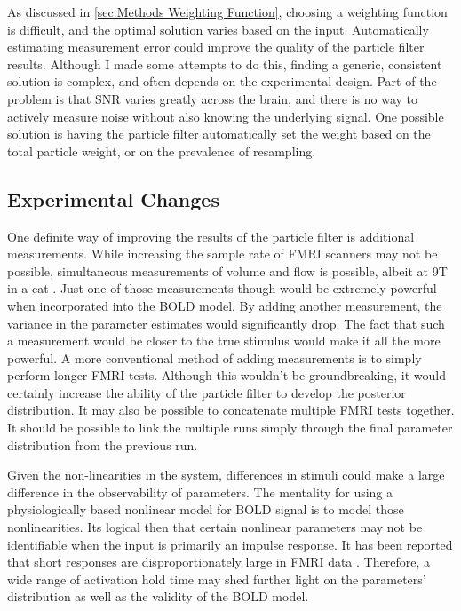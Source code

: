 As discussed in \autoref{sec:Methods Weighting Function}, choosing a weighting
function is difficult, and the optimal solution varies based on the input.
Automatically estimating measurement error could improve
the quality of the particle filter results. Although I made some attempts to do
this, finding a generic, consistent solution is complex, and often depends on the
experimental design. Part of the problem is that SNR varies greatly across
the brain, and there is no way to actively measure noise without also knowing
the underlying signal. One possible solution is having the particle filter automatically
set the weight based on the total particle weight, or on the prevalence of resampling.
 
\subsection{Experimental Changes}
\label{sec:Sideways Measurements}
One definite way of improving the results of the particle filter is additional
measurements. While increasing the sample rate of FMRI scanners may
not be possible, simultaneous measurements of volume and flow is
possible, albeit at 9T in a cat \cite{Hu2009}. Just one of those measurements
though would be extremely powerful when incorporated into the BOLD
model. By adding another measurement, the
variance in the parameter estimates would significantly drop. The fact
that such a measurement would be closer to the true stimulus would make it
all the more powerful. 
A more conventional method of adding measurements is to 
simply perform longer FMRI tests. Although this wouldn't be 
groundbreaking, it would certainly increase the ability of the 
particle filter to develop the posterior distribution. 
It may also be possible to concatenate multiple FMRI tests together.
It should be possible to link the multiple runs simply through
the final parameter distribution from the previous run. 

Given the non-linearities in the system, differences in stimuli
could make a large difference in the observability of parameters. The mentality 
for using a physiologically based nonlinear model for BOLD signal is to model 
those nonlinearities. Its logical then that certain nonlinear parameters may not
be identifiable when the input is primarily an impulse response. It 
has been reported that short responses are disproportionately large 
in FMRI data \cite{Miller2001, Deneux2006}. Therefore,
a wide range of activation hold time may shed further light on 
the parameters' distribution as well as the validity of the BOLD model. 

